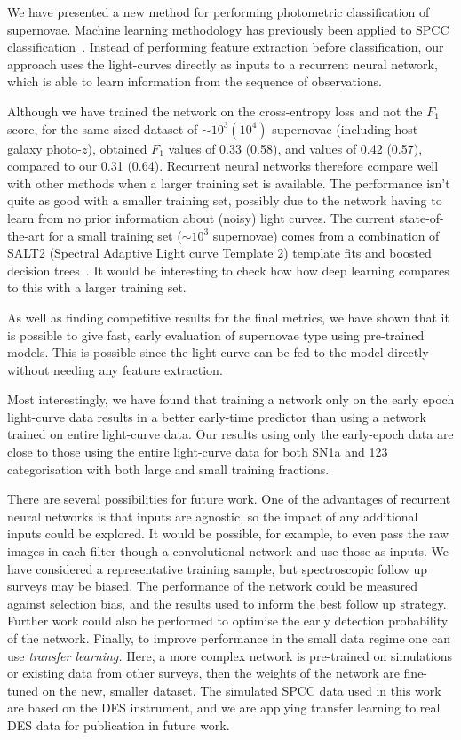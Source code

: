 \documentclass[twocolumn]{aastex61}
\begin{document}
We have presented a new method for performing photometric classification of supernovae. Machine learning methodology has previously been applied to SPCC classification~\cite{Newling:2010bp, Karpenka:2012pm, Lochner:2016hbn}. Instead of performing feature extraction before classification, our approach uses the light-curves directly as inputs to a recurrent neural network, which is able to learn information from the sequence of observations.

Although we have trained the network on the cross-entropy loss and not the $F_1$ score, for the same sized dataset of $\sim10^3 (10^4)$ supernovae (including host galaxy photo-$z$), \cite{Karpenka:2012pm} obtained $F_1$ values of 0.33 (0.58), and \cite{Newling:2010bp} values of 0.42 (0.57), compared to our  0.31 (0.64). Recurrent neural networks  therefore compare well with other methods when a larger training  set is available. The performance isn't  quite as good with a smaller training set, possibly due to the network having to learn from no prior information about (noisy) light curves. The current state-of-the-art for a small training set ($\sim10^3$ supernovae) comes from a combination of SALT2 (Spectral Adaptive Light curve Template 2) template fits and boosted decision trees~\cite{Lochner:2016hbn}. It would be interesting to check how how deep learning compares to this with a larger training set.

As well as finding competitive results for the final metrics, we have shown that it is possible to give fast, early evaluation of supernovae type using pre-trained models. This is possible since the light curve can be fed to the model directly without needing any feature extraction. 

Most interestingly, we have found that training a network only on the early epoch light-curve data results in a better early-time predictor than using a network trained on entire light-curve data. Our results using only the early-epoch data are close to those using the entire light-curve data for both SN1a and 123 categorisation with both large and small training fractions.

There are several possibilities for future work. One of the advantages of recurrent neural networks is that inputs are agnostic, so the impact of any additional inputs could be explored. It would be possible, for example, to even pass the raw images in each filter though a convolutional network and use those as inputs. We have considered a representative training sample, but spectroscopic follow up surveys may be biased. The performance of the network could be measured against selection bias, and the results used to inform the best follow up strategy.  Further work could also be performed to optimise the early detection probability of the network.  Finally, to improve performance in the small data regime one can use {\em transfer learning.} Here, a more complex network is pre-trained on simulations or existing data from other surveys, then the weights of the network are fine-tuned on the new, smaller dataset. The simulated SPCC data used in this work are based on the DES instrument, and we are applying transfer learning to real DES data for publication in future work. 
\end{document}
